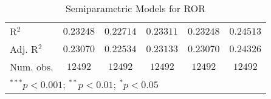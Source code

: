 \begin{table}
\begin{center}
\begin{tabular}{l c c c c c}
\hline
R$^2$            & $0.23248$        & $0.22714$        & $0.23311$        & $0.23248$        & $0.24513$        \\
Adj. R$^2$       & $0.23070$        & $0.22534$        & $0.23133$        & $0.23070$        & $0.24326$        \\
Num. obs.        & $12492$          & $12492$          & $12492$          & $12492$          & $12492$          \\
\hline
\multicolumn{6}{l}{\scriptsize{$^{***}p<0.001$; $^{**}p<0.01$; $^{*}p<0.05$}}
\end{tabular}
\caption{Semiparametric Models for ROR}
\label{tab:reg_semipar}
\end{center}
\end{table}
